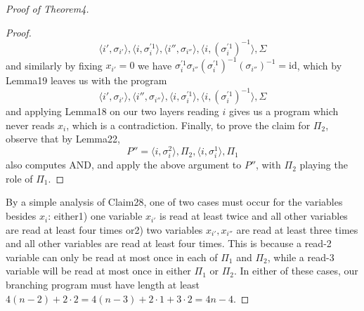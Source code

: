 \begin{proof}[Proof of Theorem4]
\begin{proof}
\[\langle i',\sigma_{i'}\rangle,\langle i,\sigma_i^{\prime1}\rangle,\langle i'',\sigma_{i''}\rangle,\langle i,(\sigma_i^{\prime1})^{-1}\rangle,\Sigma\]
and similarly by fixing $x_{i'}=0$ we have $\sigma_i^{\prime1}\sigma_{i''}(\sigma_i^{\prime1})^{-1}(\sigma_{i''})^{-1}=\mathrm{id}$, which by Lemma19 leaves us with the program
\[\langle i',\sigma_{i'}\rangle,\langle i'',\sigma_{i''}\rangle,\langle i,\sigma_i^{\prime1}\rangle,\langle i,(\sigma_i^{\prime1})^{-1}\rangle,\Sigma\]
and applying Lemma18 on our two layers reading $i$ gives us a program which never reads $x_i$, which is a contradiction.
Finally, to prove the claim for $\Pi_2$, observe that by Lemma22,
\[P''=\langle i,\sigma_i^2\rangle,\Pi_2,\langle i,\sigma_i^1\rangle,\Pi_1\]
also computes AND, and apply the above argument to $P''$, with $\Pi_2$ playing the role of $\Pi_1$.
\end{proof}
By a simple analysis of Claim28, one of two cases must occur for the variables besides $x_i$: either1) one variable $x_{i'}$ is read at least twice and all other variables are read at least four times or2) two variables $x_{i'},x_{i''}$ are read at least three times and all other variables are read at least four times. This is because a read-2 variable can only be read at most once in each of $\Pi_1$ and $\Pi_2$, while a read-3 variable will be read at most once in either $\Pi_1$ or $\Pi_2$. In either of these cases, our branching program must have length at least $4(n-2)+2\cdot2=4(n-3)+2\cdot1+3\cdot2=4n-4$.
\end{proof}
